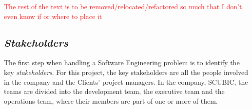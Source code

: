 \textcolor{red}{The rest of the text is to be removed/relocated/refactored so much that I don't even know if or where to place it}



\subsection{\textit{Stakeholders}}\label{methodology:s:stakeholders}

The first step when handling a Software Engineering problem is to identify the key \textit{stakeholders}. For this project, the key stakeholders are all the people involved in the company and the Clients' project managers. In the company, SCUBIC, the teams are divided into the development team, the executive team and the operations team, where their members are part of one or more of them.